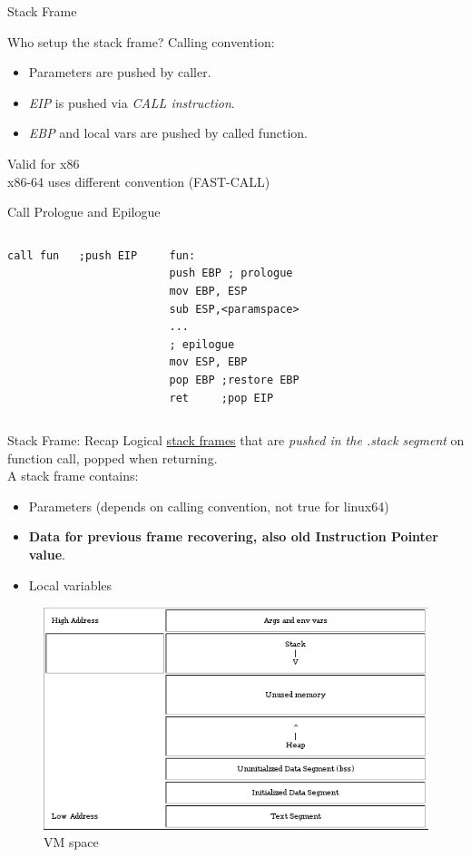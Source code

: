 \begin{frame}{Stack Frame}
\begin{block}{Who setup the stack frame?}
Calling convention:
\begin{itemize}
\item Parameters are pushed by caller.
\item \emph{EIP} is pushed via \emph{CALL instruction}.
\item \emph{EBP} and local vars are pushed by called function.
\end{itemize}
\hfill \tiny Valid for x86\\
\hfill x86-64 uses different convention (FAST-CALL)
\end{block}

\framebreak

\begin{block}{Call Prologue and Epilogue}
\begin{columns}[c]
    \acode
    \tiny
\begin{lstlisting}
call fun   ;push EIP
\end{lstlisting}
     \acode
     \tiny
\begin{lstlisting}
  fun:
  push EBP ; prologue
  mov EBP, ESP
  sub ESP,<paramspace>
  ...
  ; epilogue
  mov ESP, EBP
  pop EBP ;restore EBP
  ret     ;pop EIP
\end{lstlisting}
\end{columns}
\end{block}

\framebreak

\begin{block}{Stack Frame: Recap}
Logical \underline{stack frames} that are \emph{pushed in the .stack segment} on function call, popped when returning.\\
A stack frame contains:
\begin{itemize}
\item Parameters (depends on calling convention, not true for linux64)
\item {\bf Data for previous frame recovering, also old Instruction Pointer value}.
\item Local variables
\end{itemize}
\end{block}

\framebreak

\begin{figure}[tb]
  \centering
  \includegraphics[width=0.8\linewidth,keepaspectratio]{imgs/VMspace.png}
  \caption{VM space}
  \label{fig:vmspace}
\end{figure}
\end{frame}
